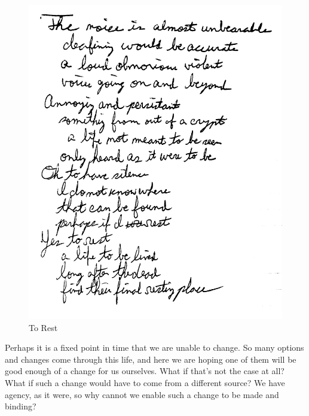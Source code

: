 \begin{figure}[h!]
  \centering
  \includegraphics[width=.5\linewidth]{2018/images/rest.jpg}
  \caption{To Rest}
  \label{fig:rest}
\end{figure}

Perhaps it is a fixed point in time that we are unable to change. So many options and
changes come through this life, and here we are hoping one of them will be good
enough of a change for us ourselves. What if that's not the case at all? What if such
a change would have to come from a different source? We have agency, as it were, so
why cannot we enable such a change to be made and binding?